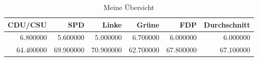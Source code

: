 \begin{table}
\caption{Meine Übersicht}
\label{tab:meine_tabelle}
\begin{tabular}{rrrrrr}
\toprule
CDU/CSU & SPD & Linke & Grüne & FDP & Durchschnitt \\
\midrule
6.800000 & 5.600000 & 5.000000 & 6.700000 & 6.000000 & 6.000000 \\
64.400000 & 69.900000 & 70.900000 & 62.700000 & 67.800000 & 67.100000 \\
\bottomrule
\end{tabular}
\end{table}

